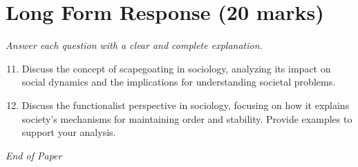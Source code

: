 \documentclass[12pt]{article}
\begin{document}
\section*{Long Form Response (20 marks)}
\textit{Answer each question with a clear and complete explanation.}
\begin{enumerate}[label=\arabic*.]
\setcounter{enumi}{10}
\item Discuss the concept of scapegoating in sociology, analyzing its impact on social dynamics and the implications for understanding societal problems.
\item Discuss the functionalist perspective in sociology, focusing on how it explains society's mechanisms for maintaining order and stability. Provide examples to support your analysis.
\end{enumerate}

\vfill
\noindent\textit{End of Paper}
\end{document}
